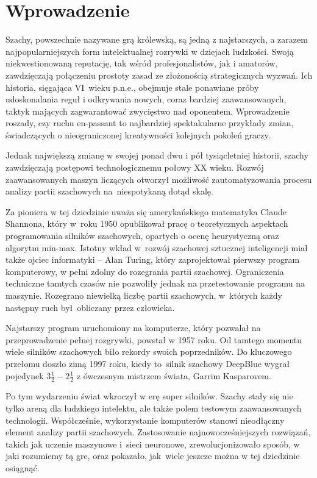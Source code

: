 \section{Wprowadzenie}
\label{sec:wprowadzenie}

Szachy, powszechnie nazywane grą królewską, są jedną z najstarszych, a zarazem najpopularniejszych form intelektualnej rozrywki w dziejach ludzkości.
Swoją niekwestionowaną reputację, tak wśród profesjonalistów, jak i amatorów, zawdzięczają połączeniu prostoty zasad ze złożonością strategicznych wyzwań.
Ich historia, sięgająca VI~wieku p.n.e., obejmuje stale ponawiane próby udoskonalania reguł i odkrywania nowych, coraz bardziej zaawansowanych, taktyk mających zagwarantować zwycięstwo nad oponentem.
Wprowadzenie roszady, czy ruchu en-passant to najbardziej spektakularne przykłady zmian, świadczących o nieograniczonej kreatywności kolejnych pokoleń graczy.


Jednak największą zmianę w swojej ponad dwu i pół tysiącletniej historii, szachy zawdzięczają postępowi technologicznemu połowy XX wieku.
Rozwój zaawansowanych maszyn liczących otworzył możliwość zautomatyzowania procesu analizy partii szachowych na~niespotykaną dotąd skalę.


Za pioniera w tej dziedzinie uważa się amerykańskiego matematyka Claude Shannona, który w~roku 1950 opublikował pracę o teoretycznych aspektach programowania silników szachowych, opartych o ocenę heurystyczną oraz algorytm min-max.
Istotny wkład w~rozwój szachowej sztucznej inteligencji miał także ojciec informatyki – Alan Turing, który zaprojektował pierwszy program komputerowy, w pełni zdolny do rozegrania partii szachowej.
Ograniczenia techniczne tamtych czasów nie pozwoliły jednak na przetestowanie programu na maszynie.
Rozegrano niewielką liczbę partii szachowych, w~których każdy następny ruch był~obliczany przez człowieka.


Najstarszy program uruchomiony na komputerze, który pozwalał na przeprowadzenie pełnej rozgrywki, powstał w 1957 roku.
Od tamtego momentu wiele silników szachowych biło rekordy swoich poprzedników.
Do kluczowego przełomu doszło zimą 1997 roku, kiedy to~silnik szachowy DeepBlue wygrał pojedynek $3\frac{1}{2} - 2\frac{1}{2}$ z ówczesnym mistrzem świata, Garrim Kasparovem.


Po tym wydarzeniu świat wkroczył w erę super silników.
Szachy stały się nie tylko areną dla ludzkiego intelektu, ale także polem testowym zaawansowanych technologii.
Współcześnie, wykorzystanie komputerów stanowi nieodłączny element analizy partii szachowych.
Zastosowanie najnowocześniejszych rozwiązań, takich jak uczenie maszynowe i~sieci neuronowe, zrewolucjonizowało sposób, w jaki rozumiemy tą gre, oraz pokazało, jak~wiele jeszcze można w tej dziedzinie osiągnąć.

